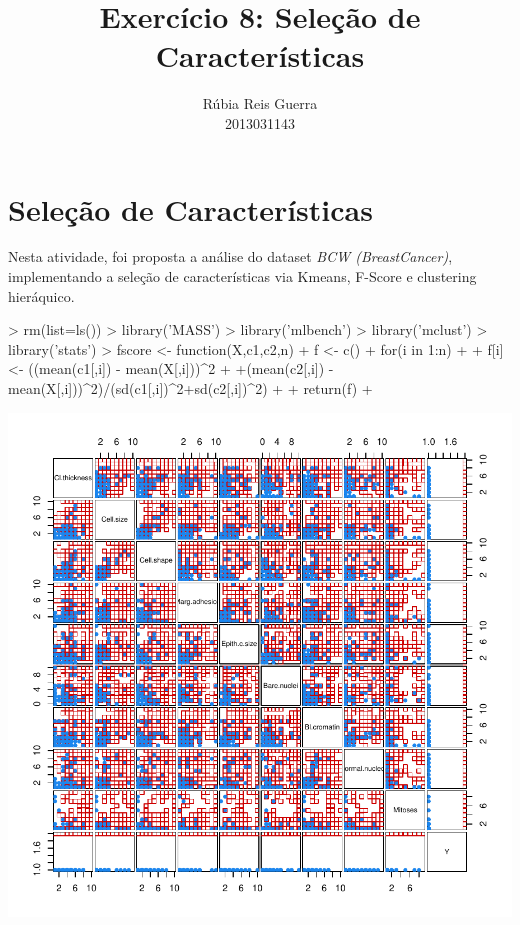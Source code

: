 \documentclass{article}
\title{Exercício 8: Seleção de Características}
\author{Rúbia Reis Guerra \\ 2013031143}
\begin{document}


\maketitle

\section{Seleção de Características}
Nesta atividade, foi proposta a análise do dataset \textit{BCW (BreastCancer)}, implementando a seleção de características via Kmeans, F-Score e clustering hieráquico.

\begin{Schunk}
\begin{Sinput}
> rm(list=ls())
> library('MASS')
> library('mlbench')
> library('mclust')
> library('stats')
> fscore <- function(X,c1,c2,n){
+   f <- c()
+   for(i in 1:n)
+   {
+     f[i] <- ((mean(c1[,i]) - mean(X[,i]))^2
+              +(mean(c2[,i]) - mean(X[,i]))^2)/(sd(c1[,i])^2+sd(c2[,i])^2)
+   }
+   return(f)
+ }
\end{Sinput}
\end{Schunk}


\begin{Schunk}
\end{Schunk}
\includegraphics{selecao-002}
\end{document}

